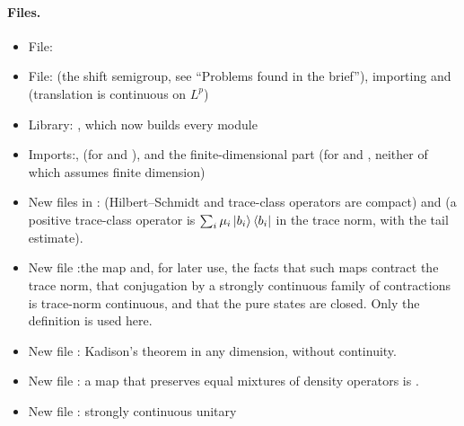 \documentclass[11pt]{article}
\begin{document}
\paragraph{Files.}\leavevmode
\begin{itemize}
\item File: 
\item File:  (the
  shift semigroup, see ``Problems found in the brief''), importing 
  and  (translation is continuous
  on $L^p$)
\item Library: , which now builds every module
\item Imports:\newline {},\newline
   (for 
  and ),\newline
  and the finite-dimensional part  (for  and
  , neither of which assumes finite dimension)
\item New files in :
   (Hilbert--Schmidt and trace-class operators are compact) and
   (a positive trace-class operator is $\sum_i \mu_i
  \ket{b_i}\bra{b_i}$ in the trace norm, with the tail estimate).
\item New file :\newline the map
   and, for later use, the facts that such maps contract the trace
  norm, that conjugation by a strongly continuous family of contractions is trace-norm
  continuous, and that the pure states are closed. Only the definition is used here.
\item New file : Kadison's theorem in any
  dimension, without continuity.
\item New file : a map that preserves equal
  mixtures of density operators is .
\item New file : strongly continuous unitary

\end{itemize}
\end{document}
